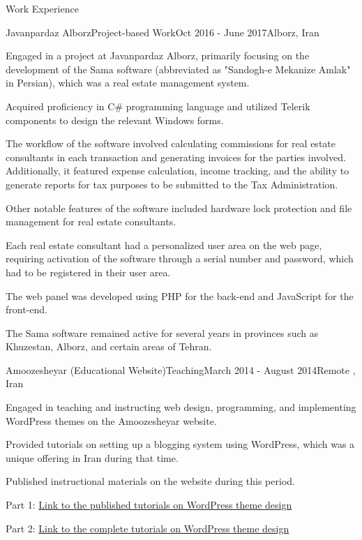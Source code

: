\documentclass[]{kyvernitis-resume}
\begin{document}
\begin{section}{Work Experience}
    \begin{subsection}{Javanpardaz Alborz}{Project-based Work}{Oct 2016 - June 2017}{Alborz, Iran}
	\item Engaged in a project at Javanpardaz Alborz, primarily focusing on the development of the Sama software (abbreviated as "Sandogh-e Mekanize Amlak" in Persian), which was a real estate management system.
	\item Acquired proficiency in C\# programming language and utilized Telerik components to design the relevant Windows forms.
	\item The workflow of the software involved calculating commissions for real estate consultants in each transaction and generating invoices for the parties involved. Additionally, it featured expense calculation, income tracking, and the ability to generate reports for tax purposes to be submitted to the Tax Administration.
	\item Other notable features of the software included hardware lock protection and file management for real estate consultants.
	\item Each real estate consultant had a personalized user area on the web page, requiring activation of the software through a serial number and password, which had to be registered in their user area.
	\item The web panel was developed using PHP for the back-end and JavaScript for the front-end.
	\item The Sama software remained active for several years in provinces such as Khuzestan, Alborz, and certain areas of Tehran.
    \end{subsection}


 \begin{subsection}{Amoozesheyar (Educational Website)}{Teaching}{March 2014 - August 2014}{Remote , Iran}
	\item Engaged in teaching and instructing web design, programming, and implementing WordPress themes on the Amoozesheyar website.
	\item Provided tutorials on setting up a blogging system using WordPress, which was a unique offering in Iran during that time.
	\item Published instructional materials on the website during this period.
	\item Part 1:  \href{https://www.daneshjooyar.com/%d9%82%d8%b3%d9%85%d8%aa-%d9%86%d9%87%d8%a7%db%8c%db%8c-%d8%b3%d8%b1%db%8c-%d8%a2%d9%85%d9%88%d8%b2%d8%b4%db%8c-%d8%b7%d8%b1%d8%a7%d8%ad%db%8c-%d9%82%d8%a7%d9%84%d8%a8-%d9%88%d8%b1%d8%af%d9%be%d8%b1/}{Link to the published tutorials on WordPress theme design} 
	\item Part 2: \href{https://www.daneshjooyar.com/%d8%a2%d9%85%d9%88%d8%b2%d8%b4-%d8%b7%d8%b1%d8%a7%d8%ad%db%8c-%d9%82%d8%a7%d9%84%d8%a8-%d9%88%d8%b1%d8%af%d9%be%d8%b1%d8%b3-%d8%aa%d9%85%d8%a7%d9%85%db%8c-%d9%82%d8%b3%d9%85%d8%aa-%d9%87%d8%a7-%d9%82/}{Link to the complete tutorials on WordPress theme design}
    \end{subsection}
    
\end{section}
\end{document}

